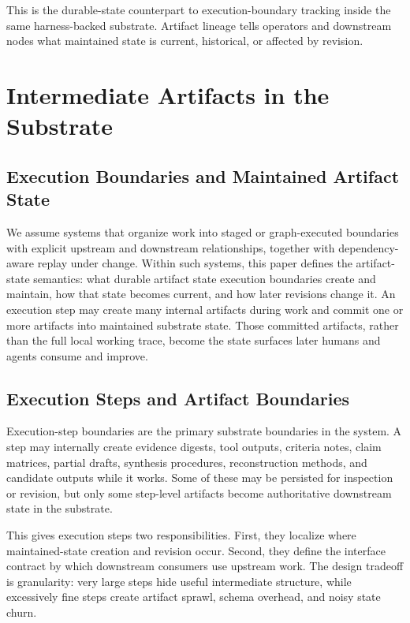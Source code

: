 \documentclass{article}
\begin{document}
This is the durable-state counterpart to execution-boundary tracking inside the same harness-backed substrate. Artifact lineage tells operators and downstream nodes what maintained state is current, historical, or affected by revision.
\section{Intermediate Artifacts in the Substrate}

\subsection{Execution Boundaries and Maintained Artifact State}

We assume systems that organize work into staged or graph-executed boundaries with explicit upstream and downstream relationships, together with dependency-aware replay under change. Within such systems, this paper defines the artifact-state semantics: what durable artifact state execution boundaries create and maintain, how that state becomes current, and how later revisions change it. An execution step may create many internal artifacts during work and commit one or more artifacts into maintained substrate state. Those committed artifacts, rather than the full local working trace, become the state surfaces later humans and agents consume and improve.

\subsection{Execution Steps and Artifact Boundaries}

Execution-step boundaries are the primary substrate boundaries in the system. A step may internally create evidence digests, tool outputs, criteria notes, claim matrices, partial drafts, synthesis procedures, reconstruction methods, and candidate outputs while it works. Some of these may be persisted for inspection or revision, but only some step-level artifacts become authoritative downstream state in the substrate.

This gives execution steps two responsibilities. First, they localize where maintained-state creation and revision occur. Second, they define the interface contract by which downstream consumers use upstream work. The design tradeoff is granularity: very large steps hide useful intermediate structure, while excessively fine steps create artifact sprawl, schema overhead, and noisy state churn.
\end{document}
